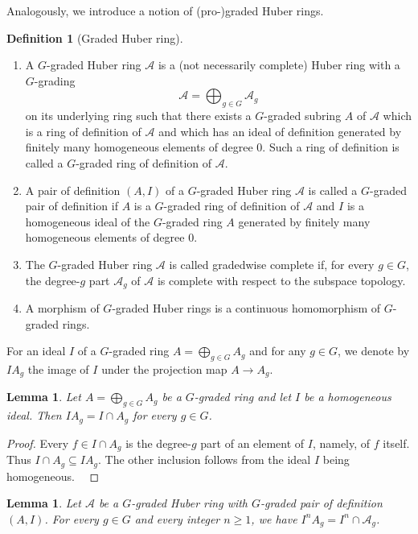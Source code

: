 \documentclass[12pt,twoside,a4paper]{article}
\newtheorem{lemma}[thm]{Lemma}
\theoremstyle{definition}
\newtheorem{mydef}[thm]{Definition}
\theoremstyle{remark}
\begin{document}
Analogously, we introduce a notion of (pro-)graded Huber rings. 
\begin{mydef}[Graded Huber ring]\label{Graded Huber ring}\begin{enumerate}[(1)]\item A $G$-graded Huber ring $\mathcal{A}$ is a (not necessarily complete) Huber ring with a $G$-grading \begin{equation*}\mathcal{A}=\bigoplus_{g\in G}\mathcal{A}_{g}\end{equation*}on its underlying ring such that there exists a $G$-graded subring $A$ of $\mathcal{A}$ which is a ring of definition of $\mathcal{A}$ and which has an ideal of definition generated by finitely many homogeneous elements of degree $0$. Such a ring of definition is called a $G$-graded ring of definition of $\mathcal{A}$. \item A pair of definition $(A, I)$ of a $G$-graded Huber ring $\mathcal{A}$ is called a $G$-graded pair of definition if $A$ is a $G$-graded ring of definition of $\mathcal{A}$ and $I$ is a homogeneous ideal of the $G$-graded ring $A$ generated by finitely many homogeneous elements of degree $0$. \item The $G$-graded Huber ring $\mathcal{A}$ is called gradedwise complete if, for every $g\in G$, the degree-$g$ part $\mathcal{A}_{g}$ of $\mathcal{A}$ is complete with respect to the subspace topology. \item A morphism of $G$-graded Huber rings is a continuous homomorphism of $G$-graded rings. \end{enumerate}\end{mydef}
For an ideal $I$ of a $G$-graded ring $A=\bigoplus_{g\in G}A_{g}$ and for any $g\in G$, we denote by $IA_{g}$ the image of $I$ under the projection map $A\to A_{g}$. 
\begin{lemma}\label{Ideals and gradings}Let $A=\bigoplus_{g\in G}A_{g}$ be a $G$-graded ring and let $I$ be a homogeneous ideal. Then $IA_{g}=I\cap A_{g}$ for every $g\in G$. \end{lemma}
\begin{proof}Every $f\in I\cap A_{g}$ is the degree-$g$ part of an element of $I$, namely, of $f$ itself. Thus $I\cap A_{g}\subseteq IA_{g}$. The other inclusion follows from the ideal $I$ being homogeneous.  \end{proof}
\begin{lemma}\label{Ideals and gradings 2}Let $\mathcal{A}$ be a $G$-graded Huber ring with $G$-graded pair of definition $(A, I)$. For every $g\in G$ and every integer $n\geq1$, we have $I^{n}A_{g}=I^{n}\cap \mathcal{A}_{g}$.\end{lemma}
\end{document}
